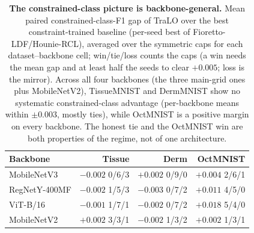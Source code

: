 \begin{table}[t]\centering\small
\setlength{\tabcolsep}{4.5pt}
\caption{\textbf{The constrained-class picture is backbone-general.} Mean paired
constrained-class-F1 gap of TraLO over the best constraint-trained baseline (per-seed best of
Fioretto-LDF/Hounie-RCL), averaged over the symmetric caps for each dataset--backbone cell;
{\scriptsize win/tie/loss} counts the caps (a win needs the mean gap and at least half the seeds
to clear $+0.005$; loss is the mirror). Across all four backbones (the three main-grid ones
plus MobileNetV2), TissueMNIST and DermMNIST show no systematic constrained-class advantage
(per-backbone means within $\pm0.003$, mostly ties), while OctMNIST is a positive margin on every
backbone. The honest tie and the OctMNIST win are both properties of the regime, not of one architecture.}
\label{tab:bbgen}
\begin{tabular}{l rrr}
\toprule
Backbone & Tissue & Derm & OctMNIST \\
\midrule
MobileNetV3    & $-0.002$ {\scriptsize 0/6/3} & $+0.002$ {\scriptsize 0/9/0} & $+0.004$ {\scriptsize 2/6/1} \\
RegNetY-400MF  & $-0.002$ {\scriptsize 1/5/3} & $-0.003$ {\scriptsize 0/7/2} & $+0.011$ {\scriptsize 4/5/0} \\
ViT-B/16       & $-0.001$ {\scriptsize 1/7/1} & $-0.002$ {\scriptsize 0/7/2} & $+0.018$ {\scriptsize 5/4/0} \\
MobileNetV2    & $+0.002$ {\scriptsize 3/3/1} & $-0.002$ {\scriptsize 1/3/2} & $+0.002$ {\scriptsize 1/3/1} \\
\bottomrule
\end{tabular}
\end{table}
